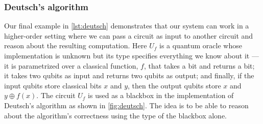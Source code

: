 \documentclass[adraft,creativecommons]{eptcs}
\theoremstyle{definition}
\theoremstyle{remark}
\begin{document}










% 

\subsubsection{Deutsch's algorithm}
Our final example in \cref{lst:deutsch} demonstrates that our system can work in a higher-order setting where we can pass a circuit as input to another circuit and reason about the resulting computation. Here $U_f$ is a quantum oracle whose implementation is unknown but its type specifies everything we know about it --- it is parametrized over a classical function, $f$, that takes a bit and returns a bit; it takes two qubits as input and returns two qubits as output; and finally, if the input qubits store classical bits $x$ and $y$, then the output qubits store $x$ and $y \oplus f(x)$. The circuit $U_f$ is used as a blackbox in the implementation of Deutsch's algorithm as shown in \cref{fig:deutsch}. The idea is to be able to reason about the algorithm's correctness using the type of the blackbox alone.
\end{document}
